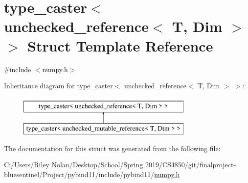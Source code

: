 \hypertarget{structtype__caster_3_01unchecked__reference_3_01_t_00_01_dim_01_4_01_4}{}\section{type\+\_\+caster$<$ unchecked\+\_\+reference$<$ T, Dim $>$ $>$ Struct Template Reference}
\label{structtype__caster_3_01unchecked__reference_3_01_t_00_01_dim_01_4_01_4}


{\ttfamily \#include $<$numpy.\+h$>$}

Inheritance diagram for type\+\_\+caster$<$ unchecked\+\_\+reference$<$ T, Dim $>$ $>$\+:\begin{figure}[H]
\begin{center}
\leavevmode
\includegraphics[height=2.000000cm]{structtype__caster_3_01unchecked__reference_3_01_t_00_01_dim_01_4_01_4}
\end{center}
\end{figure}


The documentation for this struct was generated from the following file\+:\begin{DoxyCompactItemize}
\item 
C\+:/\+Users/\+Riley Nolan/\+Desktop/\+School/\+Spring 2019/\+C\+S4850/git/finalproject-\/bluesentinel/\+Project/pybind11/include/pybind11/\mbox{\hyperlink{numpy_8h}{numpy.\+h}}\end{DoxyCompactItemize}
